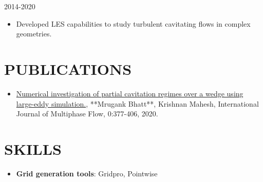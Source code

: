 \documentclass{res}
\begin{document}
\begin{resume}
	\hspace*{-0.25in}{\bf Research Assistant} \hfill 2014-2020 \\
	\hspace*{-0.25in}{\it University of Minnesota, Minnesota, MN}
	\begin{itemize}[leftmargin=\parindent]
	\setlength{\itemsep}{0mm} \smallskip
	
		\item Developed LES capabilities to study turbulent cavitating flows in complex geometries.
	\end{itemize}
	
	
	
	
		
	
	
	
	\section{\MakeUppercase{Publications}} \vskip 0.35in
	\begin{itemize}[leftmargin=\parindent]
	\setlength{\itemsep}{4pt}
	
	\item[] \href{https://dept.aem.umn.edu/~kmahesh/globalassets/publpdf/journal/mrugank_ijmf19.pdf}{Numerical investigation of partial cavitation regimes over a wedge using large-eddy simulation.}, **Mrugank Bhatt**, Krishnan Mahesh, International Journal of Multiphase Flow, 0:377-406, 2020.
	\end{itemize}
	
	
	
		
	
	\section{\MakeUppercase{Skills}} \vskip 0.35in
	\begin{itemize}[leftmargin=\parindent]
	\setlength{\itemsep}{0mm}
	
		\item[] {\bf Grid generation tools}: Gridpro, Pointwise
	\end{itemize}
	
	
	
	
	

\end{resume}
\end{document}
